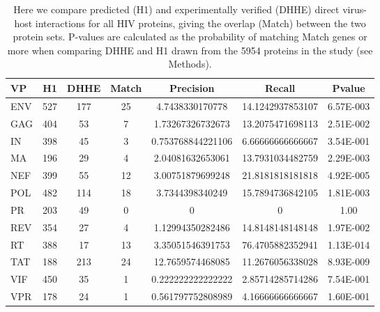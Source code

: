 \begin{table}\footnotesize
\begin{center}
  \begin{tabular}{|l|c|c|c|c|c|c|}
  \hline
   VP & H1 & DHHE & Match & Precision & Recall & Pvalue \\
  \hline
ENV & 527 & 177 & 25 & 4.7438330170778 & 14.1242937853107 & 6.57E-003 \\
GAG & 404 & 53 & 7 & 1.73267326732673 & 13.2075471698113 & 2.51E-002 \\
IN & 398 & 45 & 3 & 0.753768844221106 & 6.66666666666667 & 3.54E-001 \\
MA & 196 & 29 & 4 & 2.04081632653061 & 13.7931034482759 & 2.29E-003 \\
NEF & 399 & 55 & 12 & 3.00751879699248 & 21.8181818181818 & 4.92E-005 \\
POL & 482 & 114 & 18 & 3.7344398340249 & 15.7894736842105 & 1.81E-003 \\
PR & 203 & 49 & 0 & 0 & 0 & 1.00 \\
REV & 354 & 27 & 4 & 1.12994350282486 & 14.8148148148148 & 1.97E-002 \\
RT & 388 & 17 & 13 & 3.35051546391753 & 76.4705882352941 & 1.13E-014 \\
TAT & 188 & 213 & 24 & 12.7659574468085 & 11.2676056338028 & 8.93E-009 \\
VIF & 450 & 35 & 1 & 0.222222222222222 & 2.85714285714286 & 7.54E-001 \\
VPR & 178 & 24 & 1 & 0.561797752808989 & 4.16666666666667 & 1.60E-001 \\
\hline
  \end{tabular}
\end{center}
\caption[Validation of direct HIV-human interaction
  predictions]{\small Here we compare predicted (H1) and
  experimentally verified (DHHE) direct virus-host interactions for
  all HIV proteins, giving the overlap (Match) between the two protein
  sets. P-values are calculated as the probability of matching Match
  genes or more when comparing DHHE and H1 drawn from the 5954
  proteins in the study (see Methods). \label{tbl:medGenAdd3:direct}}
\end{table}
